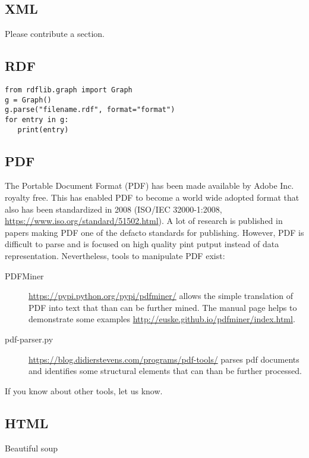 \subsection{XML}

Please contribute a section.

\subsection{RDF}

\begin{verbatim}
from rdflib.graph import Graph
g = Graph()
g.parse("filename.rdf", format="format")
for entry in g:
   print(entry)
\end{verbatim}

\subsection{PDF}

The Portable Document Format (PDF) has been made available by Adobe
Inc. royalty free. This has enabled PDF to become a world wide adopted
format that also has been standardized in 2008 (ISO/IEC 32000-1:2008,
\url{https://www.iso.org/standard/51502.html}).  A lot of research is
published in papers making PDF one of the defacto standards for
publishing. However, PDF is difficult to parse and is focused on high
quality pint putput instead of data representation. Nevertheless,
tools to manipulate PDF exist:

\begin{description}
\item[PDFMiner] \url{https://pypi.python.org/pypi/pdfminer/} allows
  the simple translation of PDF into text that than can be further
  mined. The manual page helps to demonstrate some examples
  \url{http://euske.github.io/pdfminer/index.html}.

\item[pdf-parser.py]
  \url{https://blog.didierstevens.com/programs/pdf-tools/} parses pdf
  documents and identifies some structural elements that can than be
  further processed.

\end{description}

If you know about other tools, let us know.


\subsection{HTML}

Beautiful soup

